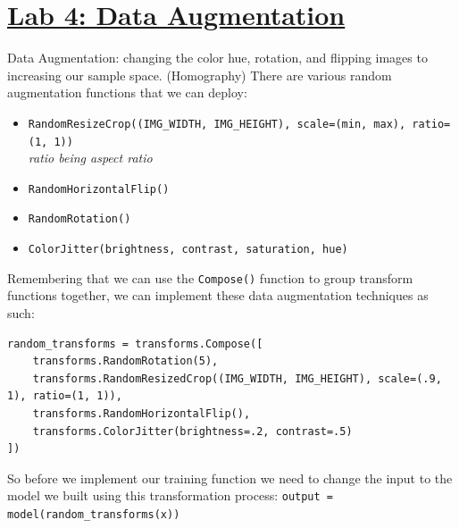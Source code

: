 \documentclass{article}
\begin{document}
\section{\href{http://dli-e5d62e622240-a8611b.westus3.cloudapp.azure.com/lab/lab/tree/04a_asl_augmentation.ipynb}{Lab 4: Data Augmentation}}
Data Augmentation: changing the color hue, rotation, and flipping images to increasing our sample space. (Homography)
There are various random augmentation functions that we can deploy: 
\begin{itemize}
    \item \verb|RandomResizeCrop((IMG_WIDTH, IMG_HEIGHT), scale=(min, max), ratio=(1, 1))|\\
        \textit{ratio being aspect ratio}
    \item \verb|RandomHorizontalFlip()|
    \item \verb|RandomRotation()|
    \item \verb|ColorJitter(brightness, contrast, saturation, hue)|
\end{itemize}
Remembering that we can use the \verb|Compose()| function to group transform functions together, we can implement these data augmentation techniques as such: 
\begin{verbatim}
random_transforms = transforms.Compose([
    transforms.RandomRotation(5),
    transforms.RandomResizedCrop((IMG_WIDTH, IMG_HEIGHT), scale=(.9, 1), ratio=(1, 1)),
    transforms.RandomHorizontalFlip(),
    transforms.ColorJitter(brightness=.2, contrast=.5)
])
\end{verbatim}
So before we implement our training function we need to change the input to the model we built using this transformation process: \verb|output = model(random_transforms(x))| 
\end{document}
